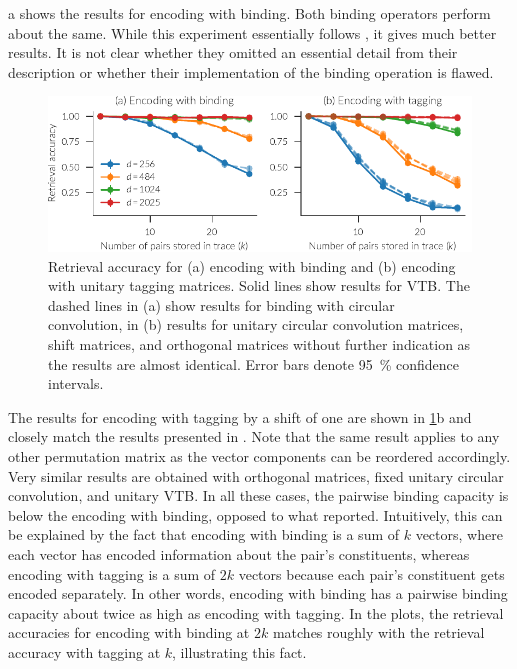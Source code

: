 a shows the results for encoding with binding.
Both binding operators perform about the same.
While this experiment essentially follows \textcite{recchia2015}, it gives much better results.
It is not clear whether they omitted an essential detail from their description or whether their implementation of the binding operation is flawed.
\begin{figure}
    \centering
    \includegraphics{figures/encoding}
    \caption[Retrieval accuracy of encoding methods.]{Retrieval accuracy for (a) encoding with binding and (b) encoding with unitary tagging matrices. Solid lines show results for VTB\@. The dashed lines in (a) show results for binding with circular convolution, in (b) results for unitary circular convolution matrices, shift matrices, and orthogonal matrices without further indication as the results are almost identical. Error bars denote \SI{95}{\percent} confidence intervals.}\label{fig:encoding}
\end{figure}

The results for encoding with tagging by a shift of one are shown in \cref{fig:encoding}b and closely match the results presented in \textcite{recchia2015}.
Note that the same result applies to any other permutation matrix as the vector components can be reordered accordingly.
Very similar results are obtained with orthogonal matrices, fixed unitary circular convolution, and unitary VTB\@.
In all these cases, the pairwise binding capacity is below the encoding with binding, opposed to what \textcite{recchia2015} reported.
Intuitively, this can be explained by the fact that encoding with binding is a sum of $k$ vectors, where each vector has encoded information about the pair's constituents, whereas encoding with tagging is a sum of $2k$ vectors because each pair's constituent gets encoded separately.
In other words, encoding with binding has a pairwise binding capacity about twice as high as encoding with tagging.
In the plots, the retrieval accuracies for encoding with binding at $2k$ matches roughly with the retrieval accuracy with tagging at $k$, illustrating this fact.

